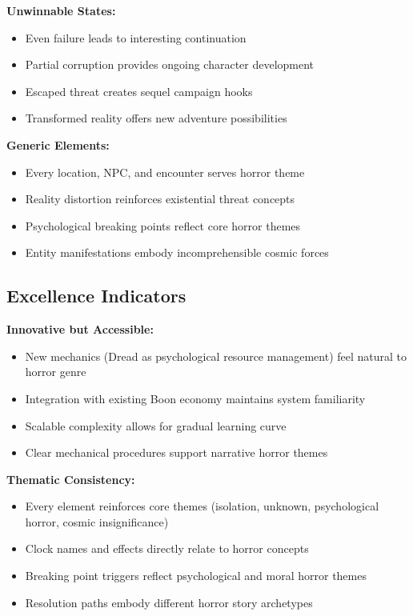 \documentclass[11pt]{article}
\begin{document}
\textbf{Unwinnable States:}
\begin{itemize}
\item Even failure leads to interesting continuation
\item Partial corruption provides ongoing character development
\item Escaped threat creates sequel campaign hooks
\item Transformed reality offers new adventure possibilities
\end{itemize}

\textbf{Generic Elements:}
\begin{itemize}
\item Every location, NPC, and encounter serves horror theme
\item Reality distortion reinforces existential threat concepts
\item Psychological breaking points reflect core horror themes
\item Entity manifestations embody incomprehensible cosmic forces
\end{itemize}

\subsection{Excellence Indicators}

\textbf{Innovative but Accessible:}
\begin{itemize}
\item New mechanics (Dread as psychological resource management) feel natural to horror genre
\item Integration with existing Boon economy maintains system familiarity
\item Scalable complexity allows for gradual learning curve
\item Clear mechanical procedures support narrative horror themes
\end{itemize}

\textbf{Thematic Consistency:}
\begin{itemize}
\item Every element reinforces core themes (isolation, unknown, psychological horror, cosmic insignificance)
\item Clock names and effects directly relate to horror concepts
\item Breaking point triggers reflect psychological and moral horror themes
\item Resolution paths embody different horror story archetypes
\end{itemize}
\end{document}
